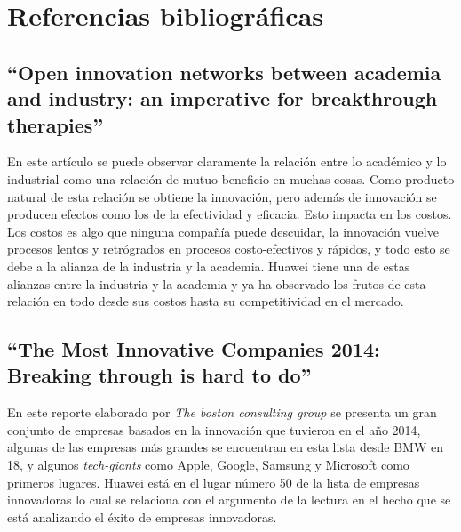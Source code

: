 \documentclass{article}
\begin{document}
\section{Referencias bibliográficas}
\subsection{``Open innovation networks between academia and industry: an imperative for breakthrough therapies''}
En este artículo se puede observar claramente la relación entre lo académico y lo industrial como una relación de mutuo beneficio en muchas cosas. Como producto natural de esta relación se obtiene la innovación, pero además de innovación se producen efectos como los de la efectividad y eficacia. Esto impacta en los costos. Los costos es algo que ninguna compañía puede descuidar, la innovación vuelve procesos lentos y retrógrados en procesos costo-efectivos y rápidos, y todo esto se debe a la alianza de la industria y la academia. Huawei tiene una de estas alianzas entre la industria y la academia y ya ha observado los frutos de esta relación en todo desde sus costos hasta su competitividad en el mercado. \cite{innovacad}

\subsection{``The Most Innovative Companies 2014: Breaking through is hard to do''}
En este reporte elaborado por \emph{The boston consulting group} se presenta un gran conjunto de empresas basados en la innovación que tuvieron en el año 2014, algunas de las empresas más grandes se encuentran en esta lista desde BMW en 18, y algunos \emph{tech-giants} como Apple, Google, Samsung y Microsoft como primeros lugares. Huawei está en el lugar número 50 de la lista de empresas innovadoras lo cual se relaciona con el argumento de la lectura en el hecho que se está analizando el éxito de empresas innovadoras. \cite{innovative}
\end{document}
